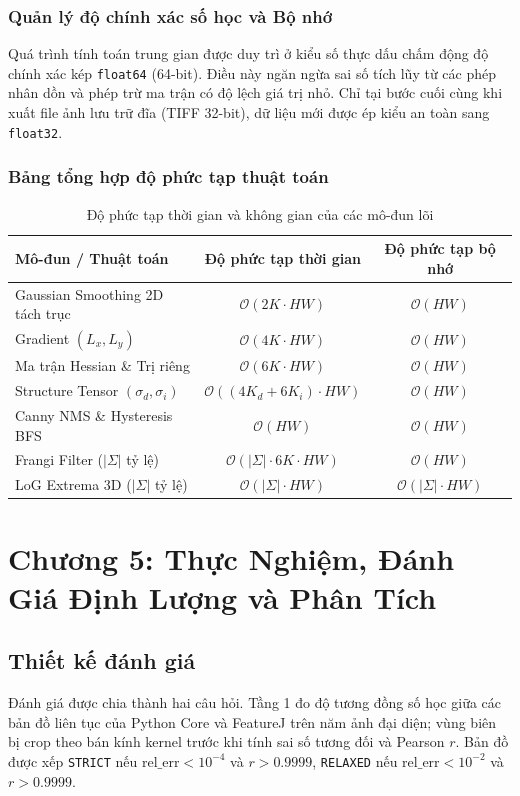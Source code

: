 \documentclass[conference]{IEEEtran}
\begin{document}
\subsubsection{Quản lý độ chính xác số học và Bộ nhớ}
Quá trình tính toán trung gian được duy trì ở kiểu số thực dấu chấm động độ chính xác kép \texttt{float64} (64-bit). Điều này ngăn ngừa sai số tích lũy từ các phép nhân dồn và phép trừ ma trận có độ lệch giá trị nhỏ. Chỉ tại bước cuối cùng khi xuất file ảnh lưu trữ đĩa (TIFF 32-bit), dữ liệu mới được ép kiểu an toàn sang \texttt{float32}.

\subsubsection{Bảng tổng hợp độ phức tạp thuật toán}
\begin{table}[htbp]
\caption{Độ phức tạp thời gian và không gian của các mô-đun lõi}
\centering
\begin{tabular}{lcc}
\toprule
\textbf{Mô-đun / Thuật toán} & \textbf{Độ phức tạp thời gian} & \textbf{Độ phức tạp bộ nhớ} \\
\midrule
Gaussian Smoothing 2D tách trục & $\mathcal{O}(2K \cdot HW)$ & $\mathcal{O}(HW)$ \\
Gradient $(L_x,L_y)$ & $\mathcal{O}(4K \cdot HW)$ & $\mathcal{O}(HW)$ \\
Ma trận Hessian \& Trị riêng & $\mathcal{O}(6K \cdot HW)$ & $\mathcal{O}(HW)$ \\
Structure Tensor $(\sigma_d, \sigma_i)$ & $\mathcal{O}((4K_d + 6K_i) \cdot HW)$ & $\mathcal{O}(HW)$ \\
Canny NMS \& Hysteresis BFS & $\mathcal{O}(HW)$ & $\mathcal{O}(HW)$ \\
Frangi Filter ($|\Sigma|$ tỷ lệ) & $\mathcal{O}(|\Sigma| \cdot 6K \cdot HW)$ & $\mathcal{O}(HW)$ \\
LoG Extrema 3D ($|\Sigma|$ tỷ lệ) & $\mathcal{O}(|\Sigma| \cdot HW)$ & $\mathcal{O}(|\Sigma| \cdot HW)$ \\
\bottomrule
\end{tabular}
\label{tab:complexity}
\end{table}

\section{Chương 5: Thực Nghiệm, Đánh Giá Định Lượng và Phân Tích}
\subsection{Thiết kế đánh giá}
Đánh giá được chia thành hai câu hỏi. Tầng 1 đo độ tương đồng số học giữa các bản đồ liên tục của Python Core và FeatureJ trên năm ảnh đại diện; vùng biên bị crop theo bán kính kernel trước khi tính sai số tương đối và Pearson $r$. Bản đồ được xếp \texttt{STRICT} nếu $\mathrm{rel\_err}<10^{-4}$ và $r>0.9999$, \texttt{RELAXED} nếu $\mathrm{rel\_err}<10^{-2}$ và $r>0.9999$.
\end{document}
